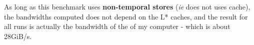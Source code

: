 
As long as this benchmark uses \textbf{non-temporal stores} (\textit{ie} does not uses cache), the bandwidths computed does not depend on the L* caches, and the result for all runs is actually the bandwidth of the  of my computer - which is about 28GiB/s.